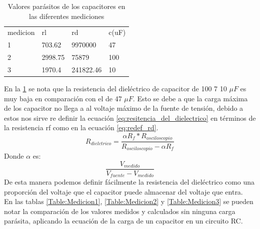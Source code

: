 \documentclass[journal]{IEEEtran}
\begin{document}
\begin{table}[]
	\centering
	\caption{Valores parásitos de los capacitores en las diferentes mediciones}
	\label{Table:Cparasitos}
	\begin{tabular}{llll}
		\cline{1-4}
		\multicolumn{1}{|l|}{medicion} & \multicolumn{1}{l|}{rl}                   & \multicolumn{1}{l|}{rd}                  & \multicolumn{1}{l|}{c(uF)}                                                    \\ \cline{1-4}
		\multicolumn{1}{|l|}{1}        & \multicolumn{1}{l|}{703.62}            & \multicolumn{1}{l|}{9970000}              & \multicolumn{1}{l|}{47}                                   \\ \cline{1-4}
		\multicolumn{1}{|l|}{2}        & \multicolumn{1}{l|}{2998.75}                     & \multicolumn{1}{l|}{75879}                      & \multicolumn{1}{l|}{100}                           \\ \cline{1-4}
		\multicolumn{1}{|l|}{3}        & \multicolumn{1}{l|}{1970.4}                     & \multicolumn{1}{l|}{241822.46}                      &\multicolumn{1}{l|}{10}       \\ \cline{1-4}
	\end{tabular}
\end{table}
En la \ref{Table:Cparasitos} se nota que la resistencia del dieléctrico de capacitor de 100 7 10 \(\mu F\) es muy baja en comparación con el de 47 \(\mu F\). Esto se debe a que la carga máxima de los capacitor no llega a al voltaje máximo de la fuente de tensión, debido a estos nos sirve re definir la ecuación \ref{eq:resitencia_del_dielectrico} en términos de la resistencia rf como en la ecuación \ref{eq:redef_rd}.
\begin{equation}
\label{eq:redef_rd} 
R_{dielctrico}=\frac{\alpha R_f*R_{osciloscopio}}{R_{osciloscopio}-\alpha R_f}
\end{equation} 
Donde \(\alpha\) es:
\[\frac{V_{medido}}{V_{fuente}-V_{medido}}\]
De esta manera podemos definir fácilmente la resistencia del dieléctrico como una proporción del voltaje que el capacitor puede almacenar del voltaje que entra.\\
En las tablas \ref{Table:Medicion1}, \ref{Table:Medicion2} y \ref{Table:Medicion3} se pueden notar la comparación de los valores medidos y calculados sin ninguna carga parásita, aplicando la ecuación de la carga de un capacitor en un circuito RC.
\end{document}
